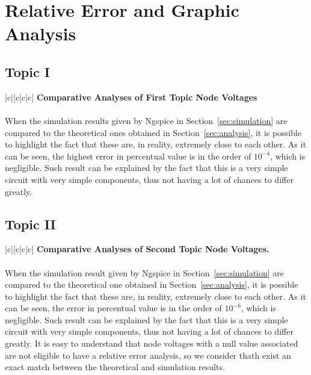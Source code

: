 \section{Relative Error and Graphic Analysis}
\label{sec:erroranalysis}

\subsection{Topic I}
\label{subsec:first_topic_error}

\begin{center}
   \begin{tabular}{|c||c|c|c|}
      \hline    
       {\bf Comparative Analyses of First Topic Node Voltages} \\
      \hline
        
   \end{tabular}
 \end{center}

\paragraph{} When the simulation results given by Ngspice in Section~\ref{sec:simulation} are compared to the theoretical ones obtained in Section~\ref{sec:analysis}, it is possible to highlight the fact that these are, in reality, extremely close to each other. As it can be seen, the highest error in percentual value is in the order of $10^{-4}$, which is negligible. Such result can be explained by the fact that this is a very simple circuit with very simple components, thus not having a lot of chances to differ greatly.

 
\subsection{Topic II}
\label{subsec:second_topic_error}

\begin{center}
   \begin{tabular}{|c||c|c|c|}
      \hline    
       {\bf Comparative Analyses of Second Topic Node Voltages.} \\
      \hline
        
   \end{tabular}   
 \end{center}

\paragraph{} When the simulation result given by Ngspice in Section~\ref{sec:simulation} are compared to the theoretical one obtained in Section~\ref{sec:analysis}, it is possible to highlight the fact that these are, in reality, extremely close to each other. As it can be seen, the error in percentual value is in the order of $10^{-6}$, which is negligible. Such result can be explained by the fact that this is a very simple circuit with very simple components, thus not having a lot of chances to differ greatly. It is easy to understand that node voltages with a null value associated are not eligible to have a relative error analysis, so we consider thath exist an exact match between the theoretical and simulation results.
 
